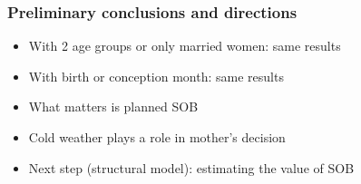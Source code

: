 \documentclass[10pt,letterpaper,subeqn]{beamer}
\begin{document}


%

\begin{frame}[label=conclusions]
\frametitle{Preliminary conclusions and directions}
\begin{itemize}
\item With 2 age groups or only married women: same results
\item With birth or conception month: same results
\item What matters is planned SOB 
\item Cold weather plays a role in mother's decision
\item Next step (structural model): estimating the value of SOB
\end{itemize}

\end{frame}
\end{document}

